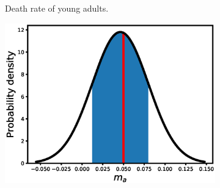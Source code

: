 \documentclass[12pt, table]{article}
\begin{document}
\begin{figure}[H]
\begin{subfigure}[b]{0.45\textwidth}
        \caption{Death rate of  young adults.}
       \label{fig2e}
   \end{subfigure}
   \begin{subfigure}[b]{0.45\textwidth}
       \includegraphics[width=1\textwidth, height=0.24\textheight]{figexple1/fma}
      

\end{subfigure}
\end{figure}
\end{document}
